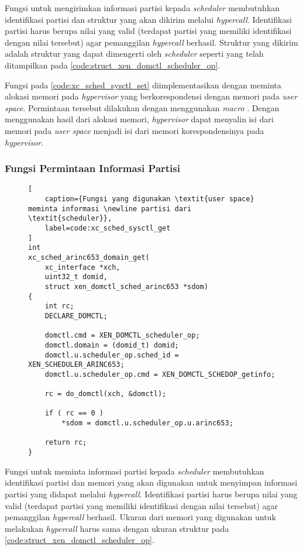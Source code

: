 Fungsi untuk mengirimkan informasi partisi kepada \textit{scheduler} membutuhkan identifikasi
partisi dan struktur yang akan dikirim melalui \textit{hypercall}. Identifikasi partisi harus
berupa nilai yang valid (terdapat partisi yang memiliki identifikasi dengan nilai tersebut) agar
pemanggilan \textit{hypercall} berhasil. Struktur yang dikirim adalah struktur yang dapat
dimengerti oleh \textit{scheduler} seperti yang telah ditampilkan pada
\autoref{code:struct_xen_domctl_scheduler_op}.

Fungsi pada \autoref{code:xc_sched_sysctl_set} diimplementasikan dengan meminta alokasi memori
pada \textit{hypervisor} yang berkorespondensi dengan memori pada \textit{user space}.
Permintaan tersebut dilakukan dengan menggunakan \textit{macro} . Dengan
menggunakan hasil dari alokasi memori, \textit{hypervisor} dapat menyalin isi dari memori pada
\textit{user space} menjadi isi dari memori korespondensinya pada \textit{hypervisor}.

\subsubsection{Fungsi Permintaan Informasi Partisi}
\label{section:fungsi_permintaan_informasi_partisi}

\begin{figure}[!h]
\begin{lstlisting}[
	caption={Fungsi yang digunakan \textit{user space} meminta informasi \newline partisi dari \textit{scheduler}},
	label=code:xc_sched_sysctl_get
]
int
xc_sched_arinc653_domain_get(
    xc_interface *xch,
    uint32_t domid,
    struct xen_domctl_sched_arinc653 *sdom)
{
    int rc;
    DECLARE_DOMCTL;

    domctl.cmd = XEN_DOMCTL_scheduler_op;
    domctl.domain = (domid_t) domid;
    domctl.u.scheduler_op.sched_id = XEN_SCHEDULER_ARINC653;
    domctl.u.scheduler_op.cmd = XEN_DOMCTL_SCHEDOP_getinfo;

    rc = do_domctl(xch, &domctl);

    if ( rc == 0 )
        *sdom = domctl.u.scheduler_op.u.arinc653;

    return rc;
}
\end{lstlisting}
\end{figure}

Fungsi untuk meminta informasi partisi kepada \textit{scheduler} membutuhkan identifikasi
partisi dan memori yang akan digunakan untuk menyimpan informasi partisi yang didapat melalui
\textit{hypercall}. Identifikasi partisi harus berupa nilai yang valid (terdapat partisi yang
memiliki identifikasi dengan nilai tersebut) agar pemanggilan \textit{hypercall} berhasil.
Ukuran dari memori yang digunakan untuk melakukan \textit{hypercall} harus sama dengan ukuran
struktur pada \autoref{code:struct_xen_domctl_scheduler_op}.

